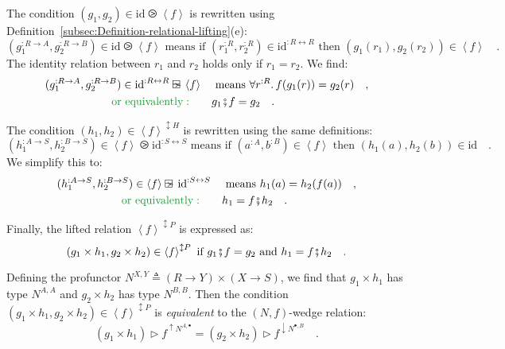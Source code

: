 The condition $(g_{1},g_{2})\in\text{id}\ogreaterthan\left<f\right>$
is rewritten using Definition~\ref{subsec:Definition-relational-lifting}(e):
\[
(g_{1}^{:R\rightarrow A},g_{2}^{:R\rightarrow B})\in\text{id}\ogreaterthan\left<f\right>\text{ means if }(r_{1}^{:R},r_{2}^{:R})\in\text{id}^{:R\leftrightarrow R}\text{ then }(g_{1}(r_{1}),g_{2}(r_{2}))\in\left<f\right>\quad.
\]
The identity relation between $r_{1}$ and $r_{2}$ holds only if
$r_{1}=r_{2}$. We find:
\begin{align*}
(g_{1}^{:R\rightarrow A},g_{2}^{:R\rightarrow B})\in\text{id}^{:R\leftrightarrow R}\ogreaterthan\left<f\right> & \quad\text{ means }\forall r^{:R}.\,f(g_{1}(r))=g_{2}(r)\quad,\\
{\color{greenunder}\text{or equivalently}:}\quad & \quad g_{1}\bef f=g_{2}\quad.
\end{align*}

The condition $(h_{1},h_{2})\in\left<f\right>^{\updownarrow H}$ is
rewritten using the same definitions:
\[
(h_{1}^{:A\rightarrow S},h_{2}^{:B\rightarrow S})\in\left<f\right>\ogreaterthan\text{id}^{:S\leftrightarrow S}\text{ means if }(a^{:A},b^{:B})\in\left<f\right>\text{ then }(h_{1}(a),h_{2}(b))\in\text{id}\quad.
\]
We simplify this to:
\begin{align*}
(h_{1}^{:A\rightarrow S},h_{2}^{:B\rightarrow S})\in\left<f\right>\ogreaterthan\text{id}^{:S\leftrightarrow S} & \quad\text{ means }h_{1}(a)=h_{2}(f(a))\quad,\\
{\color{greenunder}\text{or equivalently}:}\quad & \quad h_{1}=f\bef h_{2}\quad.
\end{align*}

Finally, the lifted relation $\left<f\right>^{\updownarrow P}$ is
expressed as:
\[
(g_{1}\times h_{1},g_{2}\times h_{2})\in\left<f\right>^{\updownarrow P}\text{ if }g_{1}\bef f=g_{2}\text{ and }h_{1}=f\bef h_{2}\quad.
\]

Defining the profunctor $N^{X,Y}\triangleq\left(R\rightarrow Y\right)\times\left(X\rightarrow S\right)$,
we find that $g_{1}\times h_{1}$ has type $N^{A,A}$ and $g_{2}\times h_{2}$
has type $N^{B,B}$. Then the condition $(g_{1}\times h_{1},g_{2}\times h_{2})\in\left<f\right>^{\updownarrow P}$
is \emph{equivalent} to the $\left(N,f\right)$-wedge relation:
\[
(g_{1}\times h_{1})\triangleright f^{\uparrow N^{A,\bullet}}=(g_{2}\times h_{2})\triangleright f^{\downarrow N^{\bullet,B}}\quad.
\]


